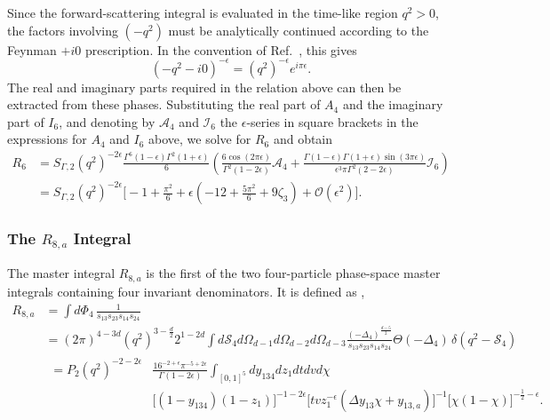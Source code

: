 Since the forward-scattering integral is evaluated in the time-like region $q^2>0$, the factors
involving $(-q^2)$ must be analytically continued according to the Feynman $+i0$ prescription.
In the convention of Ref.~\cite{GehrmannDeRidder0311276}, this gives
\begin{equation*}
    \left(-q^2-i0\right)^{-\epsilon}=\left(q^2\right)^{-\epsilon}e^{i\pi\epsilon}.
\end{equation*}
The real and imaginary parts required in the relation above can then be extracted from these
phases. Substituting the real part of $A_4$ and the imaginary part of $I_6$, and denoting by
$\mathcal A_4$ and $\mathcal I_6$ the $\epsilon$-series in square brackets in the expressions
for $A_4$ and $I_6$ above, we solve for $R_6$ and obtain
\begin{equation}
    \begin{split}
        R_6 &= S_{\Gamma,2}\!\left(q^2\right)^{-2\epsilon}\frac{\Gamma^6(1-\epsilon)\Gamma^2(1+\epsilon)}{6}\left(\frac{6\cos(2\pi\epsilon)}{\Gamma^2(1-2\epsilon)}\mathcal A_4+\frac{\Gamma(1-\epsilon)\Gamma(1+\epsilon)\sin(3\pi\epsilon)}{\epsilon^3\pi\Gamma^2(2-2\epsilon)}\mathcal I_6\right)\\
            &= S_{\Gamma,2}\!\left(q^2\right)^{-2\epsilon}\Bigg[-1+\frac{\pi^2}6+\epsilon\!\left(-12+\frac{5\pi^2}6+9\zeta_3\right)+\mathcal O\!\left(\epsilon^2\right)\Bigg].
    \end{split}
\end{equation}

\subsubsection*{The $R_{8,a}$ Integral}

The master integral $R_{8,a}$ is the first of the two four-particle phase-space master integrals
containing four invariant denominators. It is defined as \cite{GehrmannDeRidder0311276},
\begin{equation}
    \begin{split}
        R_{8,a} &= \int d\Phi_4\,\frac1{s_{13}s_{23}s_{14}s_{24}}\\
                &= (2\pi)^{4-3d}\!\left(q^2\right)^{3-\frac d2}2^{1-2d}\int d\mathcal S_4d\Omega_{d-1}d\Omega_{d-2}d\Omega_{d-3}\frac{(-\Delta_4)^{\frac{d-5}{2}}}{s_{13}s_{23}s_{14}s_{24}}\Theta(-\Delta_4)\,\delta\!\left(q^2-\mathcal S_4\right)\\
                &   \begin{split}
                        = P_2\!\left(q^2\right)^{-2-2\epsilon}&\frac{16^{-2+\epsilon}\pi^{-5+2\epsilon}}{\Gamma(1-2\epsilon)}\int_{[0,1]^5} dy_{134}dz_1dtdvd\chi\\
                                                              &\Big[(1-y_{134})(1-z_1)\Big]^{-1-2\epsilon}\Big[tvz_1^{-\epsilon}(\Delta y_{13}\chi+y_{13,a})\Big]^{-1}\Big[\chi(1-\chi)\Big]^{-\frac12-\epsilon}.
                    \end{split}
    \end{split}
\end{equation}


